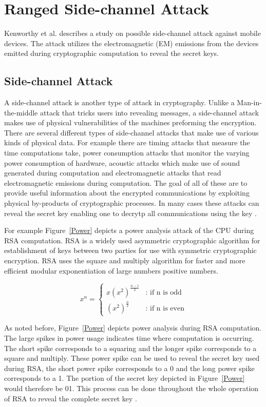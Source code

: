 \documentclass{sig-alternate}
\begin{document}
\section{Ranged Side-channel Attack}
\label{side}
Kenworthy et al. \cite{kenworthy} describes a study on possible side-channel attack against mobile devices. The attack utilizes the electromagnetic (EM) emissions from the devices emitted during cryptographic computation to reveal the secret keys.

\subsection{Side-channel Attack}
A side-channel attack is another type of attack in cryptography. Unlike a Man-in-the-middle attack that tricks users into revealing messages, a side-channel attack makes use of physical vulnerabilities of the machines preforming the encryption. There are several different types of side-channel attacks that make use of various kinds of physical data. For example there are timing attacks that measure the time computations take, power consumption attacks that monitor the varying power consumption of hardware, acoustic attacks which make use of sound generated during computation and electromagnetic attacks that read electromagnetic emissions during computation. The goal of all of these are to provide useful information about the encrypted communications by exploiting physical by-products of cryptographic processes. In many cases these attacks can reveal the secret key enabling one to decrytp all communications using the key  \cite{wiki:side-channel}.

For example Figure~\ref{Power} depicts a power analysis attack of the CPU during RSA computation. RSA is a widely used asymmetric cryptographic algorithm for establishment of keys between two parties for use with symmetric cryptographic encryption. RSA uses the square and multiply algorithm for faster and more efficient modular exponentiation of large numbers positive numbers.

\[\tag{Square and Multiply}
x^n = \left\{
  \begin{array}{lr}
    x(x^2)^{\frac{n-1}{2}} &  \text{: if n is odd} \\
    (x^2)^{\frac{n}{2}} & \text{: if n is even}
  \end{array}
\right.
\]

  As noted before, Figure~\ref{Power} depicts power analysis during RSA computation. The large spikes in power usage indicates time where computation is occurring. The short spike corresponds to a squaring and the longer spike corresponds to a square and multiply. These power spike can be used to reveal the secret key used during RSA, the short power spike corresponds to a 0 and the long power spike corresponds to a 1. The portion of the secret key depicted in Figure~\ref{Power} would therefore be 01. This process can be done throughout the whole operation of RSA to reveal the complete secret key \cite{springer}.
\end{document}
